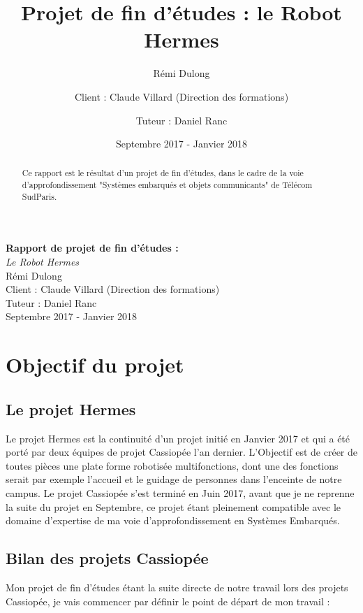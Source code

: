 \documentclass[a4paper,10pt]{report}
\title{Projet de fin d'études : le Robot Hermes}
\author{Rémi Dulong \and{Client : Claude Villard (Direction des formations)}
\and{Tuteur : Daniel Ranc}}
\date{Septembre 2017 - Janvier 2018}
\begin{document}
\begin{titlepage}
  \centering
  \vfill
  {\bfseries \Huge
      Rapport de projet de fin d'études : \\
  }
  {\huge
      \textit{Le Robot Hermes}\\
      Rémi Dulong\\
      Client : Claude Villard (Direction des formations)\\
      Tuteur : Daniel Ranc\\
      \vskip2cm
      Septembre 2017 - Janvier 2018\\
  }
  \vfill

  \vfill
  \vfill
\end{titlepage}

  \newpage

  \begin{abstract}
      {Ce rapport est le résultat d'un projet de fin d'études, dans le cadre de
       la voie d'approfondissement "Systèmes embarqués et objets communicants"
       de Télécom SudParis.}
  \end{abstract}

  \tableofcontents
  \newpage

\chapter{Objectif du projet}

  \section{Le projet Hermes}

    {Le projet Hermes est la continuité d'un projet initié en Janvier 2017 et
    qui a été porté par deux équipes de projet Cassiopée l'an dernier. L'Objectif
    est de créer de toutes pièces une plate forme robotisée multifonctions, dont
    une des fonctions serait par exemple l'accueil et le guidage de personnes dans
    l'enceinte de notre campus. Le projet Cassiopée s'est terminé en Juin 2017,
    avant que je ne reprenne la suite du projet en Septembre, ce projet étant pleinement
    compatible avec le domaine d'expertise de ma voie d'approfondissement en
    Systèmes Embarqués.}

    \section{Bilan des projets Cassiopée}

    {Mon projet de fin d'études étant la suite directe de notre travail lors des
     projets Cassiopée, je vais commencer par définir le point de départ de mon travail :}
\end{document}
